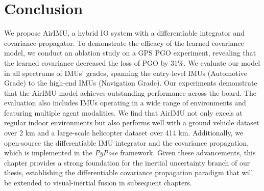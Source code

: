 \section{Conclusion}

We propose AirIMU, a hybrid IO system with a differentiable integrator and covariance propagator. 
To demonstrate the efficacy of the learned covariance model, we conduct an ablation study on a GPS PGO experiment, revealing that the learned covariance decreased the loss of PGO by 31\%. 
We evaluate our model in all spectrums of IMUs' grades, spanning the entry-level IMUs (Automotive Grade) to the high-end IMUs (Navigation Grade). 
Our experiments demonstrate that the AirIMU model achieves outstanding performance across the board. The evaluation also includes IMUs operating in a wide range of environments and featuring multiple agent modalities. 
We find that AirIMU not only excels at regular indoor environments but also performs well with a ground vehicle dataset over 2 \si{km} and a large-scale helicopter dataset over 414 \si{km}.
Additionally, we open-source the differentiable IMU integrator and the covariance propagation, which is implemented in the \textit{PyPose} framework.
Given these advancements, this chapter provides a strong foundation for the inertial uncertainty branch of our thesis, establishing the differentiable covariance propagation paradigm that will be extended to visual-inertial fusion in subsequent chapters.
